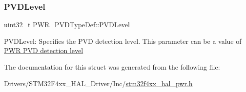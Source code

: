 \subsubsection{\texorpdfstring{P\+V\+D\+Level}{PVDLevel}}
{\footnotesize\ttfamily uint32\+\_\+t P\+W\+R\+\_\+\+P\+V\+D\+Type\+Def\+::\+P\+V\+D\+Level}

P\+V\+D\+Level\+: Specifies the P\+VD detection level. This parameter can be a value of \hyperlink{group___p_w_r___p_v_d__detection__level}{P\+WR P\+VD detection level} 

The documentation for this struct was generated from the following file\+:\begin{DoxyCompactItemize}
\item 
Drivers/\+S\+T\+M32\+F4xx\+\_\+\+H\+A\+L\+\_\+\+Driver/\+Inc/\hyperlink{stm32f4xx__hal__pwr_8h}{stm32f4xx\+\_\+hal\+\_\+pwr.\+h}\end{DoxyCompactItemize}
